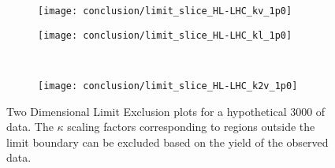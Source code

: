 \begin{figure}
    \centering
    \begin{subfigure}{0.48\textwidth} 
        \texttt{[image: conclusion/limit\_slice\_HL-LHC\_kv\_1p0]}
        \caption{}
        \label{fig:limit_slice_kv_1p0}
    \end{subfigure}
    \begin{subfigure}{0.48\textwidth}
        \texttt{[image: conclusion/limit\_slice\_HL-LHC\_kl\_1p0]}
        \caption{}
        \label{fig:limit_slice_kl_1p0}
    \end{subfigure}\\
    \begin{subfigure}{0.48\textwidth} 
        \texttt{[image: conclusion/limit\_slice\_HL-LHC\_k2v\_1p0]}
        \caption{}
        \label{fig:limit_slice_k2v_1p0}
    \end{subfigure}
    \caption{
        Two Dimensional Limit Exclusion plots for a hypothetical 3000 \ifb of data.
        The $\kappa$ scaling factors corresponding to regions outside the limit boundary
            can be excluded based on the yield of the observed data.
    }
    \label{fig:limit_slices_future}
\end{figure}


